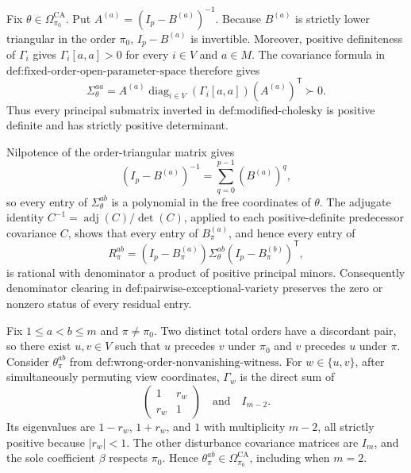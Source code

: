 Fix \(\theta\in\Omega_{\pi_0}^{\mathrm{CA}}\).  Put \(A^{(a)}=(I_p-B^{(a)})^{-1}\).  Because \(B^{(a)}\) is strictly lower triangular in the order \(\pi_0\), \(I_p-B^{(a)}\) is invertible.  Moreover, positive definiteness of \(\Gamma_i\) gives \(\Gamma_i[a,a]>0\) for every \(i\in V\) and \(a\in M\).  The covariance formula in \(\text{def:fixed-order-open-parameter-space}\) therefore gives
\[
\Sigma_\theta^{aa}
=A^{(a)}\operatorname{diag}_{i\in V}(\Gamma_i[a,a])(A^{(a)})^{\mathsf T}
\succ0.
\]
Thus every principal submatrix inverted in \(\text{def:modified-cholesky}\) is positive definite and has strictly positive determinant.

Nilpotence of the order-triangular matrix gives
\[
(I_p-B^{(a)})^{-1}=\sum_{q=0}^{p-1}(B^{(a)})^q,
\]
so every entry of \(\Sigma_\theta^{ab}\) is a polynomial in the free coordinates of \(\theta\).  The adjugate identity \(C^{-1}=\operatorname{adj}(C)/\det(C)\), applied to each positive-definite predecessor covariance \(C\), shows that every entry of \(B_\pi^{(a)}\), and hence every entry of
\[
R_\pi^{ab}=(I_p-B_\pi^{(a)})\Sigma_\theta^{ab}
(I_p-B_\pi^{(b)})^{\mathsf T},
\]
is rational with denominator a product of positive principal minors.  Consequently denominator clearing in \(\text{def:pairwise-exceptional-variety}\) preserves the zero or nonzero status of every residual entry.

Fix \(1\le a<b\le m\) and \(\pi\ne\pi_0\).  Two distinct total orders have a discordant pair, so there exist \(u,v\in V\) such that \(u\) precedes \(v\) under \(\pi_0\) and \(v\) precedes \(u\) under \(\pi\).  Consider \(\theta_\pi^{ab}\) from \(\text{def:wrong-order-nonvanishing-witness}\).  For \(w\in\{u,v\}\), after simultaneously permuting view coordinates, \(\Gamma_w\) is the direct sum of
\[
\begin{pmatrix}1&r_w\\ r_w&1\end{pmatrix}
\quad\text{and}\quad I_{m-2}.
\]
Its eigenvalues are \(1-r_w\), \(1+r_w\), and \(1\) with multiplicity \(m-2\), all strictly positive because \(\lvert r_w\rvert<1\).  The other disturbance covariance matrices are \(I_m\), and the sole coefficient \(\beta\) respects \(\pi_0\).  Hence \(\theta_\pi^{ab}\in\Omega_{\pi_0}^{\mathrm{CA}}\), including when \(m=2\).

